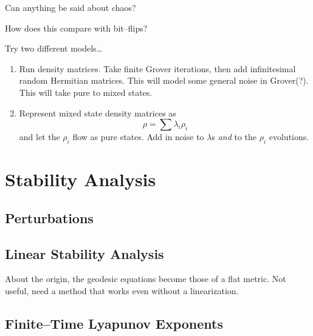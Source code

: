 Can anything be said about chaos?

How does this compare with bit--flips?

Try two different models\dots
\begin{enumerate}
\item Run density matrices.  Take finite Grover iterations, then add
infinitesimal random Hermitian matrices.  This will model some general
noise in Grover(?). This will take pure to mixed states.
\item Represent mixed state density matrices as
\begin{equation}
\rho = \sum\lambda_i\rho_i
\end{equation}
and let the $\rho_i$ flow as pure states.  Add in noise to $\lambda$s
{\sl and} to the $\rho_i$ evolutions.
\end{enumerate}



\section{Stability Analysis}

\subsection{Perturbations}

\subsection{Linear Stability Analysis}

About the origin, the geodesic equations become those of a flat metric.
Not useful, need a method that works even without a linearization.


\subsection{Finite--Time Lyapunov Exponents}

